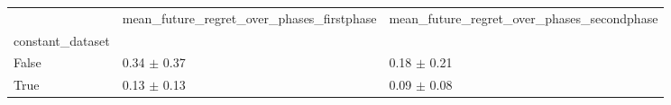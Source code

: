\begin{tabular}{lll}
\toprule
 & mean_future_regret_over_phases_firstphase & mean_future_regret_over_phases_secondphase \\
constant_dataset &  &  \\
\midrule
False & 0.34 $\pm$ 0.37 & 0.18 $\pm$ 0.21 \\
True & 0.13 $\pm$ 0.13 & 0.09 $\pm$ 0.08 \\
\bottomrule
\end{tabular}
